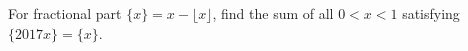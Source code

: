 For fractional part $\{x\}=x-\lfloor x\rfloor $, find the sum of all $ 0<x<1 $ satisfying $\{2017x\}=\{x\}$.
